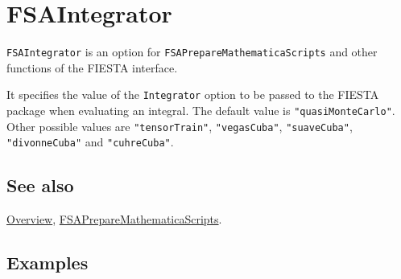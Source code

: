 \documentclass[../FeynHelpersManual.tex]{subfiles}
\begin{document}
\begin{Shaded}
\begin{Highlighting}[]
 
\end{Highlighting}
\end{Shaded}

\hypertarget{fsaintegrator}{
\section{FSAIntegrator}\label{fsaintegrator}}

\texttt{FSAIntegrator} is an option for
\texttt{FSAPrepareMathematicaScripts} and other functions of the FIESTA
interface.

It specifies the value of the \texttt{Integrator} option to be passed to
the FIESTA package when evaluating an integral. The default value is
\texttt{"quasiMonteCarlo"}. Other possible values are
\texttt{"tensorTrain"}, \texttt{"vegasCuba"}, \texttt{"suaveCuba"},
\texttt{"divonneCuba"} and \texttt{"cuhreCuba"}.

\subsection{See also}

\hyperlink{toc}{Overview},
\hyperlink{fsapreparemathematicascripts}{FSAPrepareMathematicaScripts}.

\subsection{Examples}
\end{document}
